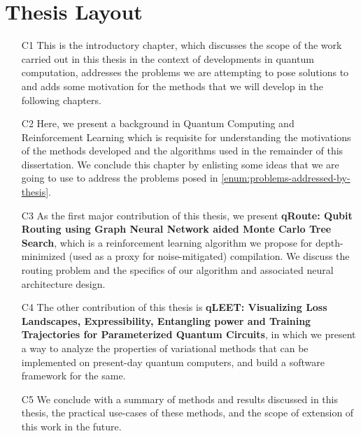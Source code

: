 \section{Thesis Layout}

\begin{itemize}
    \item[C1] This is the introductory chapter, which discusses the scope of the work carried out in this thesis in the context of developments in quantum computation, addresses the problems we are attempting to pose solutions to and adds some motivation for the methods that we will develop in the following chapters.
    \item[C2] Here, we present a background in Quantum Computing and Reinforcement Learning which is requisite for understanding the motivations of the methods developed and the algorithms used in the remainder of this dissertation. We conclude this chapter by enlisting some ideas that we are going to use to address the problems posed in \ref{enum:problems-addressed-by-thesis}.
    \item[C3] As the first major contribution of this thesis, we present \textbf{qRoute: Qubit Routing using Graph Neural Network aided Monte Carlo Tree Search}, which is a reinforcement learning algorithm we propose for depth-minimized (used as a proxy for noise-mitigated) compilation. We discuss the routing problem and the specifics of our algorithm and associated neural architecture design.
    \item[C4] The other contribution of this thesis is \textbf{qLEET: Visualizing Loss Landscapes, Expressibility, Entangling power and Training Trajectories for Parameterized Quantum Circuits}, in which we present a way to analyze the properties of variational methods that can be implemented on present-day quantum computers, and build a software framework for the same.
    \item[C5] We conclude with a summary of methods and results discussed in this thesis, the practical use-cases of these methods, and the scope of extension of this work in the future.
\end{itemize}
